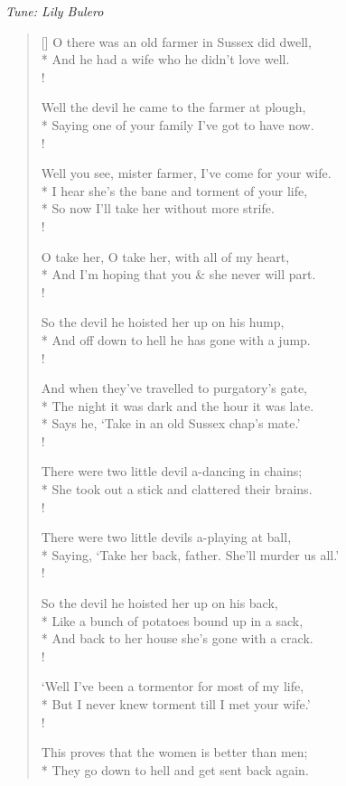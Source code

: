 \documentclass[MAIN]{subfiles}
\begin{document}
\begin{center}
\emph{Tune: Lily Bulero}
\end{center}

\bigskip

\settowidth{\versewidth}{Well you see, mister farmer, I've come for your wife.}
\begin{verse}[\versewidth]
O there was an old farmer in Sussex did dwell,\\*
And he had a wife who he didn't love well.\\!

Well the devil he came to the farmer at plough,\\*
Saying one of your family I've got to have now.\\!

Well you see, mister farmer, I've come for your wife.\\*
I hear she's the bane and torment of your life,\\*
So now I'll take her without more strife.\\!

O take her, O take her, with all of my heart,\\*
And I'm hoping that you \& she never will part.\\!

So the devil he hoisted her up on his hump,\\*
And off down to hell he has gone with a jump.\\!

And when they've travelled to purgatory's gate,\\*
The night it was dark and the hour it was late.\\*
Says he, `Take in an old Sussex chap's mate.'\\!

There were two little devil a-dancing in chains;\\*
She took out a stick and clattered their brains.\\!

There were two little devils a-playing at ball,\\*
Saying, `Take her back, father. She'll murder us all.'\\!

So the devil he hoisted her up on his back,\\*
Like a bunch of potatoes bound up in a sack,\\*
And back to her house she's gone with a crack.\\!

`Well I've been a tormentor for most of my life,\\*
But I never knew torment till I met your wife.'\\!

This proves that the women is better than men;\\*
They go down to hell and get sent back again.
\end{verse}
\end{document}
